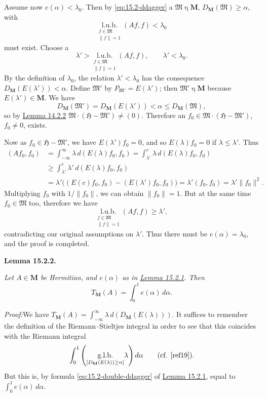 \documentclass[12pt,b5paper,twoside]{article}
\newcommand{\Hspace}{\mathfrak H}
\newcommand{\M}{\mathbf M}
\newcommand{\Lemma}[1]{%
  \par\smallskip\noindent\phantomsection\label{lem:#1}\textbf{Lemma #1.}\enspace
}
\newcommand{\Proof}{\par\noindent\textit{Proof:}\enspace}
\newcommand{\lemref}[1]{\hyperref[lem:#1]{Lemma #1}}
\begin{document}
Assume now \(e(\alpha)<\lambda_0\). Then by
\eqref{eq:15.2-ddagger} a \(\mathfrak M\mathbin\eta\M\),
\(D_{\M}(\mathfrak M)\geq\alpha\), with
\[
\underset{\substack{f\in\mathfrak M\\\lVert f\rVert=1}}
{\mathrm{l.u.b.}}(Af,f)<\lambda_0
\]
must exist. Choose a
\[
\lambda'>
\underset{\substack{f\in\mathfrak M\\\lVert f\rVert=1}}
{\mathrm{l.u.b.}}(Af,f),\qquad \lambda'<\lambda_0.
\]
By the definition of \(\lambda_0\), the relation \(\lambda'<\lambda_0\)
has the consequence \(D_{\M}(E(\lambda'))<\alpha\). Define
\(\mathfrak M'\) by \(P_{\mathfrak M'}=E(\lambda')\); then
\(\mathfrak M'\mathbin\eta\M\) because \(E(\lambda')\in\M\). We have
\[
D_{\M}(\mathfrak M')=D_{\M}(E(\lambda'))<\alpha
\leq D_{\M}(\mathfrak M),
\]
so by \lemref{14.2.2}
\(\mathfrak M\cdot(\Hspace-\mathfrak M')\ne(0)\). Therefore an
\(f_0\in\mathfrak M\cdot(\Hspace-\mathfrak M')\), \(f_0\ne0\), exists.

Now as \(f_0\in\Hspace-\mathfrak M'\), we have \(E(\lambda')f_0=0\), and
so \(E(\lambda)f_0=0\) if \(\lambda\leq\lambda'\). Thus
\[
\begin{aligned}
(Af_0,f_0)
 &=\int_{-\infty}^{\infty}\lambda\,d(E(\lambda)f_0,f_0)
  =\int_{\lambda'}^{c}\lambda\,d(E(\lambda)f_0,f_0)\\
 &\geq\int_{\lambda'}^{c}\lambda'\,d(E(\lambda)f_0,f_0)\\
 &=\lambda'\bigl((E(c)f_0,f_0)-(E(\lambda')f_0,f_0)\bigr)
  =\lambda'(f_0,f_0)=\lambda'\lVert f_0\rVert^2.
\end{aligned}
\]
Multiplying \(f_0\) with \(1/\lVert f_0\rVert\), we can obtain
\(\lVert f_0\rVert=1\). But at the same time \(f_0\in\mathfrak M\) too,
therefore we have
\[
\underset{\substack{f\in\mathfrak M\\\lVert f\rVert=1}}
{\mathrm{l.u.b.}}(Af,f)\geq\lambda',
\]
contradicting our original assumptions on \(\lambda'\). Thus there must be
\(e(\alpha)=\lambda_0\), and the proof is completed.

\Lemma{15.2.2}
{\itshape Let \(A\in\M\) be Hermitian, and \(e(\alpha)\) as in
\lemref{15.2.1}. Then
\[
T_{\M}(A)=\int_0^1 e(\alpha)\,d\alpha.
\]}

\Proof We have
\(T_{\M}(A)=\int_{-\infty}^{\infty}\lambda\,
d(D_{\M}(E(\lambda)))\). It suffices to remember the definition of the
Riemann--Stieltjes integral in order to see that this coincides with the
Riemann integral
\[
\int_0^1
\left(\underset{[D_{\M}(E(\lambda))\geq\alpha]}
{\mathrm{g.l.b.}}\lambda\right)d\alpha
\qquad\text{(cf. \cite[p.~198]{ref19}).}
\]
But this is, by formula \eqref{eq:15.2-double-ddagger} of \lemref{15.2.1},
equal to \(\int_0^1e(\alpha)\,d\alpha\).
\end{document}
